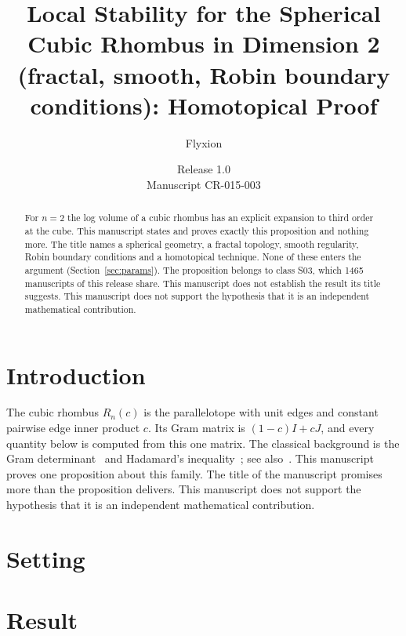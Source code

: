 \documentclass[11pt]{article}
\title{Local Stability for the Spherical Cubic Rhombus in Dimension 2 (fractal, smooth, Robin boundary conditions): Homotopical Proof}
\author{Flyxion}
\date{Release 1.0\\ Manuscript CR-015-003}
\begin{document}
\maketitle
\begin{abstract}
For $n=2$ the log volume of a cubic rhombus has an explicit expansion to third order at the cube. This manuscript states and proves exactly this proposition and nothing more. The title names a spherical geometry, a fractal topology, smooth regularity, Robin boundary conditions and a homotopical technique. None of these enters the argument (Section~\ref{sec:params}). The proposition belongs to class S03, which 1465 manuscripts of this release share. This manuscript does not establish the result its title suggests. This manuscript does not support the hypothesis that it is an independent mathematical contribution.
\end{abstract}

\section{Introduction}
The cubic rhombus $R_n(c)$ is the parallelotope with unit edges and constant pairwise edge inner product $c$. Its Gram matrix is $(1-c)I+cJ$, and every quantity below is computed from this one matrix. The classical background is the Gram determinant~\cite{gram} and Hadamard's inequality~\cite{hadamard}; see also~\cite{hj}.
This manuscript proves one proposition about this family. The title of the manuscript promises more than the proposition delivers. This manuscript does not support the hypothesis that it is an independent mathematical contribution.

\section{Setting}


\section{Result}

\end{document}
